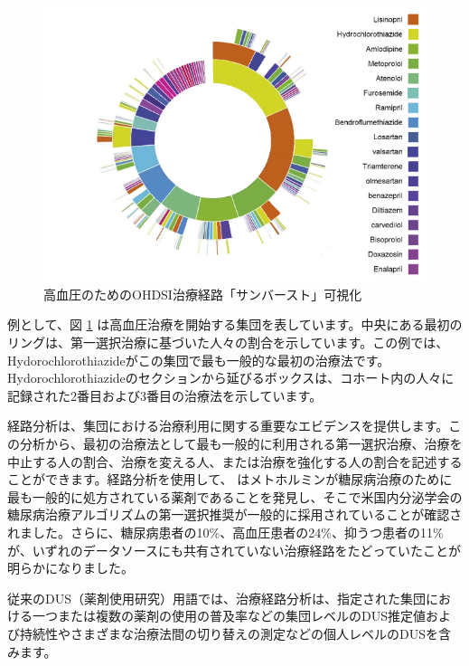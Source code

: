 \documentclass[
  11pt]{book}
\theoremstyle{definition}
\theoremstyle{definition}
\theoremstyle{definition}
\theoremstyle{definition}
\theoremstyle{remark}
\begin{document}
\begin{figure}

{\centering \includegraphics[width=1\linewidth]{images/Characterization/pnasTreatmentPathwaysSunburst} 

}

\caption{高血圧のためのOHDSI治療経路「サンバースト」可視化}\label{fig:treatmentPathwaysSunburstDataViz}
\end{figure}

例として、図 \ref{fig:treatmentPathwaysSunburstDataViz} は高血圧治療を開始する集団を表しています。中央にある最初のリングは、第一選択治療に基づいた人々の割合を示しています。この例では、Hydorochlorothiazideがこの集団で最も一般的な最初の治療法です。Hydorochlorothiazideのセクションから延びるボックスは、コホート内の人々に記録された2番目および3番目の治療法を示しています。

経路分析は、集団における治療利用に関する重要なエビデンスを提供します。この分析から、最初の治療法として最も一般的に利用される第一選択治療、治療を中止する人の割合、治療を変える人、または治療を強化する人の割合を記述することができます。経路分析を使用して、\citet{Hripcsak7329} はメトホルミンが糖尿病治療のために最も一般的に処方されている薬剤であることを発見し、そこで米国内分泌学会の糖尿病治療アルゴリズムの第一選択推奨が一般的に採用されていることが確認されました。さらに、糖尿病患者の10\%、高血圧患者の24\%、抑うつ患者の11\%が、いずれのデータソースにも共有されていない治療経路をたどっていたことが明らかになりました。

従来のDUS（薬剤使用研究）用語では、治療経路分析は、指定された集団における一つまたは複数の薬剤の使用の普及率などの集団レベルのDUS推定値および持続性やさまざまな治療法間の切り替えの測定などの個人レベルのDUSを含みます。
\end{document}
